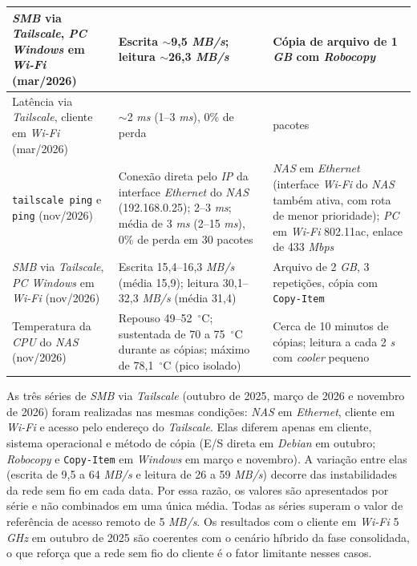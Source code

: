 \begin{quadro}[H]
\begin{tabularx}{\linewidth}{|>{\raggedright\arraybackslash}X|>{\raggedright\arraybackslash}X|>{\raggedright\arraybackslash}X|}
        \hline
        \textit{SMB} via \textit{Tailscale}, \textit{PC Windows} em \textit{Wi-Fi} (mar/2026) & Escrita $\sim$9,5 \textit{MB/s}; leitura $\sim$26,3 \textit{MB/s} & Cópia de arquivo de 1 \textit{GB} com \textit{Robocopy} \\
        \hline
        Latência via \textit{Tailscale}, cliente em \textit{Wi-Fi} (mar/2026) & $\sim$2 \textit{ms} (1--3 \textit{ms}), 0\% de perda & 29 pacotes \\
        \hline
        \texttt{tailscale ping} e \texttt{ping} (nov/2026) & Conexão direta pelo \textit{IP} da interface \textit{Ethernet} do \textit{NAS} (192.168.0.25); 2--3 \textit{ms}; média de 3 \textit{ms} (2--15 \textit{ms}), 0\% de perda em 30 pacotes & \textit{NAS} em \textit{Ethernet} (interface \textit{Wi-Fi} do \textit{NAS} também ativa, com rota de menor prioridade); \textit{PC} em \textit{Wi-Fi} 802.11ac, enlace de 433 \textit{Mbps} \\
        \hline
        \textit{SMB} via \textit{Tailscale}, \textit{PC Windows} em \textit{Wi-Fi} (nov/2026) & Escrita 15,4--16,3 \textit{MB/s} (média 15,9); leitura 30,1--32,3 \textit{MB/s} (média 31,4) & Arquivo de 2 \textit{GB}, 3 repetições, cópia com \texttt{Copy-Item} \\
        \hline
        Temperatura da \textit{CPU} do \textit{NAS} (nov/2026) & Repouso 49--52~$^\circ$C; sustentada de 70 a 75~$^\circ$C durante as cópias; máximo de 78,1~$^\circ$C (pico isolado) & Cerca de 10 minutos de cópias; leitura a cada 2 \textit{s} com \textit{cooler} pequeno \\
        \hline
    \end{tabularx}
    \vspace{0.2cm}
\end{quadro}

As três séries de \textit{SMB} via \textit{Tailscale} (outubro de 2025, março de 2026 e novembro de 2026) foram realizadas nas mesmas condições: \textit{NAS} em \textit{Ethernet}, cliente em \textit{Wi-Fi} e acesso pelo endereço do \textit{Tailscale}. Elas diferem apenas em cliente, sistema operacional e método de cópia (E/S direta em \textit{Debian} em outubro; \textit{Robocopy} e \texttt{Copy-Item} em \textit{Windows} em março e novembro). A variação entre elas (escrita de 9,5 a 64 \textit{MB/s} e leitura de 26 a 59 \textit{MB/s}) decorre das instabilidades da rede sem fio em cada data. Por essa razão, os valores são apresentados por série e não combinados em uma única média. Todas as séries superam o valor de referência de acesso remoto de 5 \textit{MB/s}. Os resultados com o cliente em \textit{Wi-Fi} 5 \textit{GHz} em outubro de 2025 são coerentes com o cenário híbrido da fase consolidada, o que reforça que a rede sem fio do cliente é o fator limitante nesses casos.

